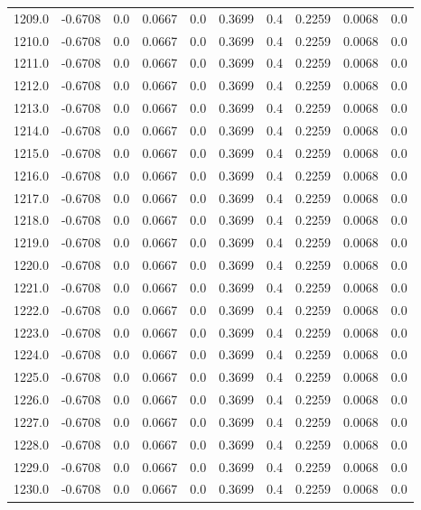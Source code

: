 \begin{longtable}{lrrrrrrrrr}
1209.0 & -0.6708 & 0.0 & 0.0667 & 0.0 & 0.3699 & 0.4 & 0.2259 & 0.0068 & 0.0 \\
1210.0 & -0.6708 & 0.0 & 0.0667 & 0.0 & 0.3699 & 0.4 & 0.2259 & 0.0068 & 0.0 \\
1211.0 & -0.6708 & 0.0 & 0.0667 & 0.0 & 0.3699 & 0.4 & 0.2259 & 0.0068 & 0.0 \\
1212.0 & -0.6708 & 0.0 & 0.0667 & 0.0 & 0.3699 & 0.4 & 0.2259 & 0.0068 & 0.0 \\
1213.0 & -0.6708 & 0.0 & 0.0667 & 0.0 & 0.3699 & 0.4 & 0.2259 & 0.0068 & 0.0 \\
1214.0 & -0.6708 & 0.0 & 0.0667 & 0.0 & 0.3699 & 0.4 & 0.2259 & 0.0068 & 0.0 \\
1215.0 & -0.6708 & 0.0 & 0.0667 & 0.0 & 0.3699 & 0.4 & 0.2259 & 0.0068 & 0.0 \\
1216.0 & -0.6708 & 0.0 & 0.0667 & 0.0 & 0.3699 & 0.4 & 0.2259 & 0.0068 & 0.0 \\
1217.0 & -0.6708 & 0.0 & 0.0667 & 0.0 & 0.3699 & 0.4 & 0.2259 & 0.0068 & 0.0 \\
1218.0 & -0.6708 & 0.0 & 0.0667 & 0.0 & 0.3699 & 0.4 & 0.2259 & 0.0068 & 0.0 \\
1219.0 & -0.6708 & 0.0 & 0.0667 & 0.0 & 0.3699 & 0.4 & 0.2259 & 0.0068 & 0.0 \\
1220.0 & -0.6708 & 0.0 & 0.0667 & 0.0 & 0.3699 & 0.4 & 0.2259 & 0.0068 & 0.0 \\
1221.0 & -0.6708 & 0.0 & 0.0667 & 0.0 & 0.3699 & 0.4 & 0.2259 & 0.0068 & 0.0 \\
1222.0 & -0.6708 & 0.0 & 0.0667 & 0.0 & 0.3699 & 0.4 & 0.2259 & 0.0068 & 0.0 \\
1223.0 & -0.6708 & 0.0 & 0.0667 & 0.0 & 0.3699 & 0.4 & 0.2259 & 0.0068 & 0.0 \\
1224.0 & -0.6708 & 0.0 & 0.0667 & 0.0 & 0.3699 & 0.4 & 0.2259 & 0.0068 & 0.0 \\
1225.0 & -0.6708 & 0.0 & 0.0667 & 0.0 & 0.3699 & 0.4 & 0.2259 & 0.0068 & 0.0 \\
1226.0 & -0.6708 & 0.0 & 0.0667 & 0.0 & 0.3699 & 0.4 & 0.2259 & 0.0068 & 0.0 \\
1227.0 & -0.6708 & 0.0 & 0.0667 & 0.0 & 0.3699 & 0.4 & 0.2259 & 0.0068 & 0.0 \\
1228.0 & -0.6708 & 0.0 & 0.0667 & 0.0 & 0.3699 & 0.4 & 0.2259 & 0.0068 & 0.0 \\
1229.0 & -0.6708 & 0.0 & 0.0667 & 0.0 & 0.3699 & 0.4 & 0.2259 & 0.0068 & 0.0 \\
1230.0 & -0.6708 & 0.0 & 0.0667 & 0.0 & 0.3699 & 0.4 & 0.2259 & 0.0068 & 0.0 \\

\end{longtable}

